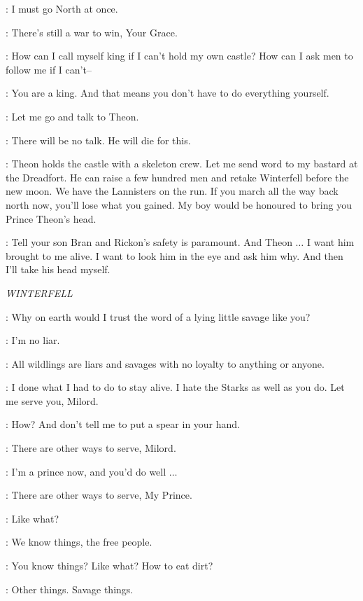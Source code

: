 \ROBB: I must go North at once. 

\ROOSE: There's still a war to win, Your Grace. 

\ROBB: How can I call myself king if I can't hold my own castle? How can I ask men to follow me if I can't--

\ROOSE: You are a king. And that means you don't have to do everything yourself. 

\CATELYN: Let me go and talk to Theon. 

\ROBB: There will be no talk. He will die for this. 

\ROOSE: Theon holds the castle with a skeleton crew. Let me send word to my bastard at the Dreadfort. He can raise a few hundred men and retake Winterfell before the new moon. We have the Lannisters on the run. If you march all the way back north now, you'll lose what you gained. My boy would be honoured to bring you Prince Theon's head. 

\ROBB: Tell your son Bran and Rickon's safety is paramount. And Theon $\ldots$ I want him brought to me alive. I want to look him in the eye and ask him why. And then I'll take his head myself. 


\scene

\textit{WINTERFELL} 


\THEON: Why on earth would I trust the word of a lying little savage like you? 

\OSHA: I'm no liar. 

\THEON: All wildlings are liars and savages with no loyalty to anything or anyone. 

\OSHA: I done what I had to do to stay alive. I hate the Starks as well as you do. Let me serve you, Milord. 

\THEON: How? And don't tell me to put a spear in your hand. 

\OSHA: There are other ways to serve, Milord. 

\THEON: I'm a prince now, and you'd do well $\ldots$ 

\OSHA: There are other ways to serve, My Prince. 

\THEON: Like what? 

\OSHA: We know things, the free people. 

\THEON: You know things? Like what? How to eat dirt? 

\OSHA: Other things. Savage things.


